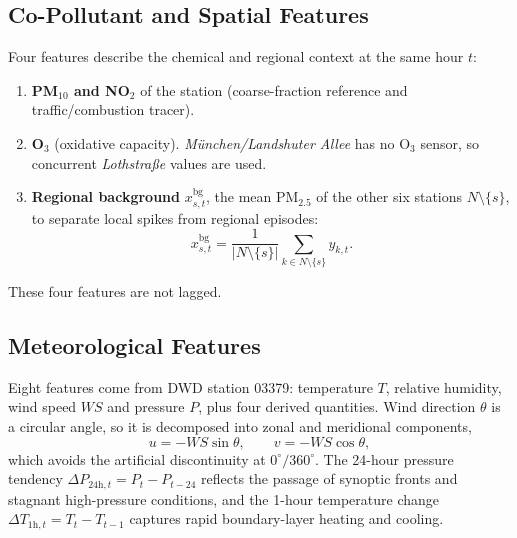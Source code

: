 \subsection{Co-Pollutant and Spatial Features}
\label{subsection:copollutant-features}
Four features describe the chemical and regional context at the same hour $t$:
\begin{enumerate}
    \item \textbf{PM$_{10}$ and NO$_2$} of the station (coarse-fraction reference and traffic/combustion tracer).
    \item \textbf{O$_3$} (oxidative capacity). \textit{M\"unchen/Landshuter Allee} has no O$_3$ sensor, so concurrent \textit{Lothstra{\ss}e} values are used.
    \item \textbf{Regional background} $x^{\text{bg}}_{s,t}$, the mean PM$_{2.5}$ of the other six stations $N\setminus\{s\}$, to separate local spikes from regional episodes:
    \begin{equation}
        x^{\text{bg}}_{s, t} = \frac{1}{|N \setminus \{s\}|} \sum_{k \in N \setminus \{s\}} y_{k, t}.
    \end{equation}
\end{enumerate}
These four features are not lagged.

\subsection{Meteorological Features}
\label{subsection:meteorological-features}
Eight features come from DWD station 03379: temperature $T$, relative humidity, wind speed $WS$ and pressure $P$, plus four derived quantities. Wind direction $\theta$ is a circular angle, so it is decomposed into zonal and meridional components,
\begin{equation}
    u = -WS \sin\theta, \qquad v = -WS \cos\theta,
\end{equation}
which avoids the artificial discontinuity at $0^\circ/360^\circ$. The 24-hour pressure tendency $\Delta P_{24\text{h},t} = P_t - P_{t-24}$ reflects the passage of synoptic fronts and stagnant high-pressure conditions, and the 1-hour temperature change $\Delta T_{1\text{h},t} = T_t - T_{t-1}$ captures rapid boundary-layer heating and cooling.

